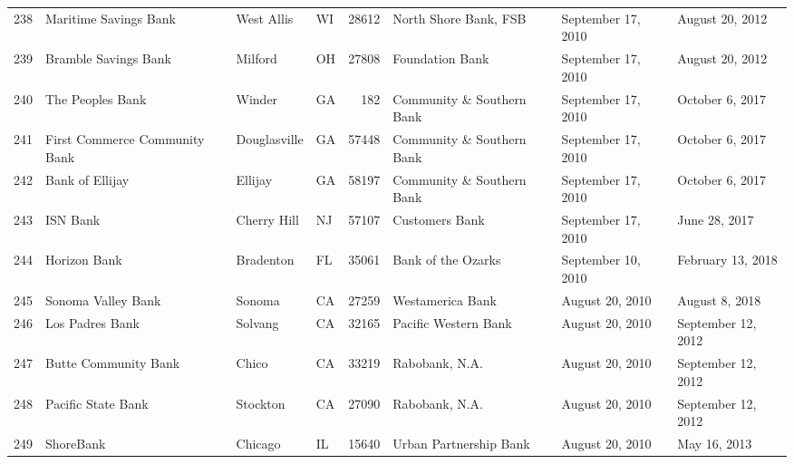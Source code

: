 \begin{tabular}{llllrlll}
238 &                              Maritime Savings Bank &          West Allis &  WI &  28612 &                              North Shore Bank, FSB &  September 17, 2010 &     August 20, 2012 \\
239 &                               Bramble Savings Bank &             Milford &  OH &  27808 &                                    Foundation Bank &  September 17, 2010 &     August 20, 2012 \\
240 &                                   The Peoples Bank &              Winder &  GA &    182 &                          Community \& Southern Bank &  September 17, 2010 &     October 6, 2017 \\
241 &                      First Commerce Community Bank &        Douglasville &  GA &  57448 &                          Community \& Southern Bank &  September 17, 2010 &     October 6, 2017 \\
242 &                                    Bank of Ellijay &             Ellijay &  GA &  58197 &                          Community \& Southern Bank &  September 17, 2010 &     October 6, 2017 \\
243 &                                           ISN Bank &         Cherry Hill &  NJ &  57107 &                                     Customers Bank &  September 17, 2010 &       June 28, 2017 \\
244 &                                       Horizon Bank &           Bradenton &  FL &  35061 &                                 Bank of the Ozarks &  September 10, 2010 &   February 13, 2018 \\
245 &                                 Sonoma Valley Bank &              Sonoma &  CA &  27259 &                                   Westamerica Bank &     August 20, 2010 &      August 8, 2018 \\
246 &                                    Los Padres Bank &             Solvang &  CA &  32165 &                               Pacific Western Bank &     August 20, 2010 &  September 12, 2012 \\
247 &                               Butte Community Bank &               Chico &  CA &  33219 &                                     Rabobank, N.A. &     August 20, 2010 &  September 12, 2012 \\
248 &                                 Pacific State Bank &            Stockton &  CA &  27090 &                                     Rabobank, N.A. &     August 20, 2010 &  September 12, 2012 \\
249 &                                          ShoreBank &             Chicago &  IL &  15640 &                             Urban Partnership Bank &     August 20, 2010 &        May 16, 2013 \\

\end{tabular}
